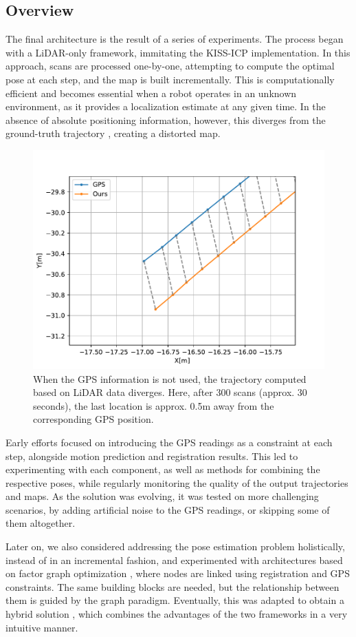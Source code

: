 \subsection{Overview}

The final architecture is the result of a series of experiments. The process began with a LiDAR-only framework, immitating the KISS-ICP \cite{vizzo2023ral} implementation.  In this approach, scans are processed one-by-one, attempting to compute the optimal pose at each step, and the map is built incrementally. This is computationally efficient and becomes essential when a robot operates in an unknown environment, as it provides a localization estimate at any given time. In the absence of absolute positioning information, however, this diverges from the ground-truth trajectory , creating a distorted map.

\begin{figure}[h]
	\centering
	\includegraphics[width=0.5\linewidth]{images/deviation_30s.pdf}
	\caption[Trajectory deviation from GPS]{When the GPS information is not used, the trajectory computed based on LiDAR data diverges. Here, after 300 scans (approx. 30 seconds), the last location is approx. 0.5m away from the corresponding GPS position.}
	\label{fig:deviation-no-gps}
\end{figure}

Early efforts focused on introducing the GPS readings as a constraint at each step, alongside motion prediction and registration results. This led to experimenting with each component, as well as methods for combining the respective poses, while regularly monitoring the quality of the output trajectories and maps. As the solution was evolving, it was tested on more challenging scenarios, by adding artificial noise to the GPS readings, or skipping some of them altogether.

Later on, we also considered addressing the pose estimation problem holistically, instead of in an incremental fashion, and experimented with architectures based on factor graph optimization \cite{dellaert2017factor}, where nodes are linked using registration and GPS constraints. The same building blocks are needed, but the relationship between them is guided by the graph paradigm. Eventually, this was adapted to obtain a hybrid solution , which combines the advantages of the two frameworks in a very intuitive manner.


